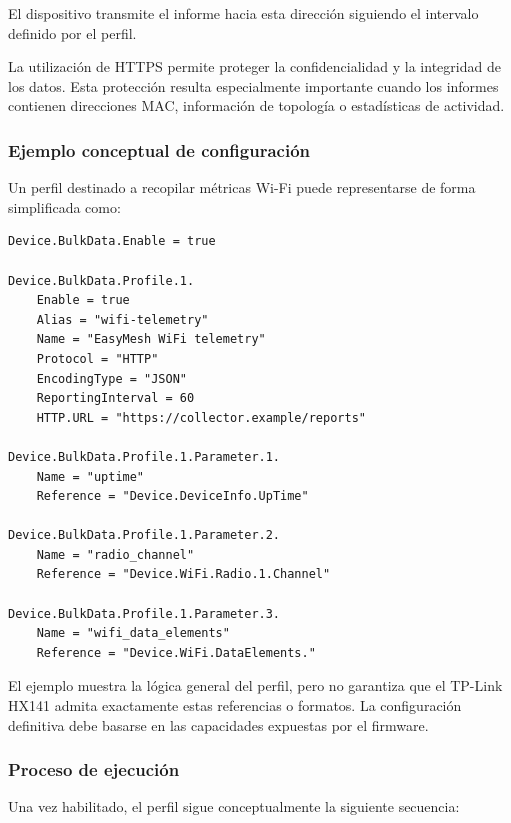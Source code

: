 El dispositivo transmite el informe hacia esta dirección siguiendo el
intervalo definido por el perfil.

La utilización de HTTPS permite proteger la confidencialidad y la
integridad de los datos. Esta protección resulta especialmente importante
cuando los informes contienen direcciones MAC, información de topología
o estadísticas de actividad.


\subsubsection*{Ejemplo conceptual de configuración}

Un perfil destinado a recopilar métricas Wi-Fi puede representarse de
forma simplificada como:

\begin{verbatim}
Device.BulkData.Enable = true

Device.BulkData.Profile.1.
    Enable = true
    Alias = "wifi-telemetry"
    Name = "EasyMesh WiFi telemetry"
    Protocol = "HTTP"
    EncodingType = "JSON"
    ReportingInterval = 60
    HTTP.URL = "https://collector.example/reports"

Device.BulkData.Profile.1.Parameter.1.
    Name = "uptime"
    Reference = "Device.DeviceInfo.UpTime"

Device.BulkData.Profile.1.Parameter.2.
    Name = "radio_channel"
    Reference = "Device.WiFi.Radio.1.Channel"

Device.BulkData.Profile.1.Parameter.3.
    Name = "wifi_data_elements"
    Reference = "Device.WiFi.DataElements."
\end{verbatim}

El ejemplo muestra la lógica general del perfil, pero no garantiza que el
TP-Link HX141 admita exactamente estas referencias o formatos. La
configuración definitiva debe basarse en las capacidades expuestas por el
firmware.


\subsubsection*{Proceso de ejecución}

Una vez habilitado, el perfil sigue conceptualmente la siguiente
secuencia:


